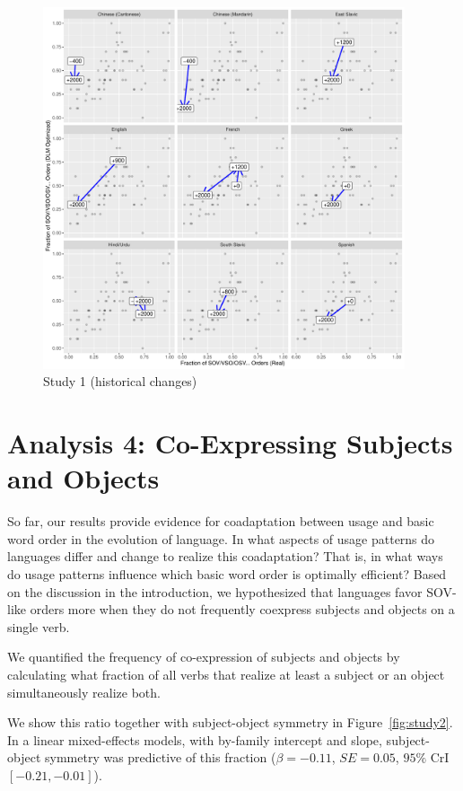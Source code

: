 \documentclass[11pt,a4paper]{article}
\begin{document}
\begin{figure}
    \centering
    \includegraphics[width=0.95\textwidth]{figures/historical_2.6_times.pdf}
    \caption{Study 1 (historical changes)}
    \label{fig:historical}
\end{figure}




\section{Analysis 4: Co-Expressing Subjects and Objects}

So far, our results provide evidence for coadaptation between usage and basic word order in the evolution of language.
In what aspects of usage patterns do languages differ and change to realize this coadaptation?
That is, in what ways do usage patterns influence which basic word order is optimally efficient?
Based on the discussion in the introduction, we hypothesized that languages favor SOV-like orders more when they do not frequently coexpress subjects and objects on a single verb.

We quantified the frequency of co-expression of subjects and objects by calculating what fraction of all verbs that realize at least a subject or an object simultaneously realize both.

We show this ratio together with subject-object symmetry in Figure~\ref{fig:study2}.
In a linear mixed-effects models, with by-family intercept and slope, subject-object symmetry was predictive of this fraction ($\beta=-0.11$, $SE=0.05$, $95\%$ CrI $[-0.21, -0.01]$).
\end{document}
